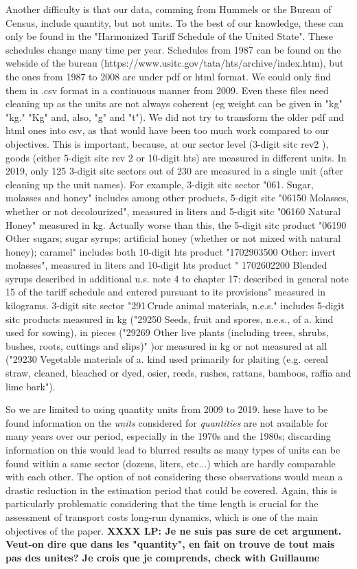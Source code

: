 \documentclass[a4paper,11pt]{article}
\begin{document}
Another difficulty is that our data, comming from Hummels or the Bureau of Census, include quantity, but not units.
To the best of our knowledge, these can only be found in the "Harmonized Tariff Schedule of the United State".
These schedules change many time per year.
Schedules from 1987 can be found on the webside of the bureau (https://www.usitc.gov/tata/hts/archive/index.htm), but the ones from 1987 to 2008 are under pdf or html format.
We could only find them in .csv format in a continuous manner from 2009.
Even these files need cleaning up as the units are not always coherent (eg weight can be given in "kg" "kg." "Kg" and, also, "g" and "t").
We did not try to transform the older pdf and html ones into csv, as that would have been too much work compared to our objectives.
This is important, because, at our sector level (3-digit  sitc rev2 ), goods (either 5-digit sitc rev 2 or 10-digit hts) are measured in different units.
In 2019, only 125 3-digit sitc sectors out of 230 are measured in a single unit (after cleaning up the unit names).
For example, 3-digit sitc sector "061. Sugar, molasses and honey" includes among other products, 5-digit sitc "06150 Molasses, whether or not decolourized", measured in liters and 5-digit sitc "06160 Natural Honey" measured in kg.
Actually worse than this, the 5-digit sitc product "06190 Other sugars; sugar syrups; artificial honey (whether or not mixed with natural honey); caramel" includes both 10-digit hts product "1702903500 Other: invert molasses", measured in liters and 10-digit hts product " 1702602200 Blended syrups described in additional u.s. note 4 to chapter 17: described in general note 15 of the tariff schedule and entered pursuant to its provisions"  measured in kilograms.
3-digit sitc sector "291 Crude animal materials, n.e.s." includes 5-digit sitc products measured in kg ("29250 Seeds, fruit and spores, n.e.s., of a. kind used for sowing), in pieces ("29269 Other live plants (including trees, shrubs, bushes, roots, cuttings and slips)" )or measured in kg or not measured at all ("29230 Vegetable materials of a. kind used primarily for plaiting (e.g. cereal straw, cleaned, bleached or dyed, osier, reeds, rushes, rattans, bamboos, raffia and lime bark").



So we are limited to using quantity units from 2009 to 2019.
hese have to be found information on the \textit{units} considered for \textit{quantities} are not available for many years over our period, especially in the 1970s and the 1980s; discarding information on this would lead to blurred results as many types of units can be found within a same sector (dozens, liters, etc...) which are hardly comparable with each other. The option of not considering these observations would mean a drastic reduction in the estimation period that could be covered. Again, this is particularly problematic considering that the time length is crucial for the assessment of transport costs long-run dynamics, which is one of the main objectives of the paper. \textbf{XXXX LP: Je ne suis pas sure de cet argument. Veut-on dire que dans les "quantity", en fait on trouve de tout mais pas des unites? Je crois que je comprends, check with Guillaume }
\end{document}
